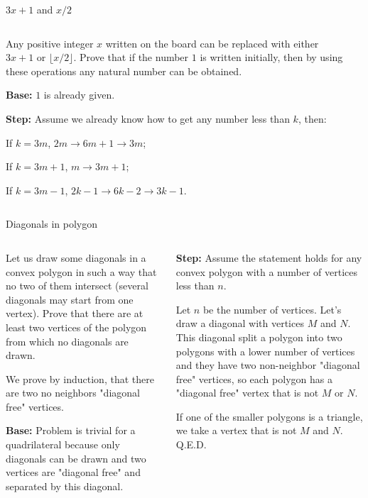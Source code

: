 \documentclass[9pt,aspectratio=169,handout]{beamer}
\begin{document}
\begin{frame}{$3x+1$ and $x/2$}
  \begin{columns}[T]
    \begin{column}{0.5\textwidth}
      \begin{problem}
        Any positive integer $x$ written on the board can be replaced with either $3x+1$ or $\lfloor x/2 \rfloor$. Prove that if the number $1$ is written initially, then by using these operations any natural number can be obtained.
      \end{problem}\pause
      
      \textbf{Base:} $1$ is already given.\pause

      \textbf{Step:} Assume we already know how to get any number less than $k$, then:

      If $k = 3m$, $2m \to 6m + 1 \to 3m$;\pause
      
      If $k = 3m + 1$, $m \to 3m + 1$;\pause

      If $k = 3m - 1$, $2k - 1 \to 6k - 2 \to 3k - 1$.\pause

    \end{column}
    \begin{column}{0.5\textwidth}
    \end{column}
  \end{columns}
\end{frame}

\begin{frame}{Diagonals in polygon}
  \begin{columns}[T]
    \begin{column}{0.5\textwidth}
      \begin{problem}
        Let us draw some diagonals in a convex polygon in such a way that no two of them intersect (several diagonals may start from one vertex). Prove that there are at least two vertices of the polygon from which no diagonals are drawn.
      \end{problem}\pause

      We prove by induction, that there are two no neighbors "diagonal free" vertices.

      \textbf{Base:} Problem is trivial for a quadrilateral because only diagonals can be drawn and two vertices are "diagonal free" and separated by this diagonal.\pause

    \end{column}
    \begin{column}{0.5\textwidth}
      \textbf{Step:} Assume the statement holds for any convex polygon with a number of vertices less than $n$.\pause

      Let $n$ be the number of vertices. Let's draw a diagonal with vertices $M$ and $N$. This diagonal split a polygon into two polygons with a lower number of vertices and they have two non-neighbor "diagonal free" vertices, so each polygon has a "diagonal free" vertex that is not $M$ or $N$.\pause

      If one of the smaller polygons is a triangle, we take a vertex that is not $M$ and $N$. \hfill Q.E.D. 
    \end{column}
  \end{columns}
\end{frame}
\end{document}
